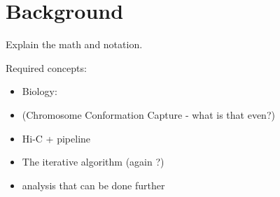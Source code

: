 \chapter{Background}\label{chap:background}
Explain the math and notation.





Required concepts:
\begin{itemize}
    \item Biology:
    \item (Chromosome Conformation Capture - what is that even?)
    \item Hi-C  + pipeline
    \item The iterative algorithm (again ?)
    \item analysis that can be done further
\end{itemize}

